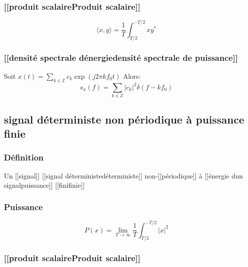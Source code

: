 \documentclass[
]{article}
\begin{document}
\hypertarget{produit-scalaireproduit-scalaire}{%
\subsubsection{{[}{[}produit scalaire\textbar Produit
scalaire{]}{]}}\label{produit-scalaireproduit-scalaire}}

\[
\langle x, y \rangle = \frac{1}{T} \int^{-T/2}_{T/2} x y^\ast
\]

\hypertarget{densituxe9-spectrale-duxe9nergiedensituxe9-spectrale-de-puissance}{%
\subsubsection{{[}{[}densité spectrale
d\textquotesingle énergie\textbar densité spectrale de
puissance{]}{]}}\label{densituxe9-spectrale-duxe9nergiedensituxe9-spectrale-de-puissance}}

Soit
\(x(t) = \displaystyle\sum_{k\in \mathbb{Z}} c_k \exp(j2\pi k f_0 t)\)
Alors: \[
s_x(f) = \sum_{k\in \mathbb{Z}} |c_k|^2 \delta(f - kf_0)
\]

\hypertarget{signal-duxe9terministe-non-puxe9riodique-uxe0-puissance-finie}{%
\subsection{signal déterministe non périodique à puissance
finie}\label{signal-duxe9terministe-non-puxe9riodique-uxe0-puissance-finie}}

\hypertarget{duxe9finition-2}{%
\subsubsection{Définition}\label{duxe9finition-2}}

Un {[}{[}signal{]}{]} {[}{[}signal
déterministe\textbar déterministe{]}{]} non-{[}{[}périodique{]}{]} à
{[}{[}énergie d\textquotesingle un signal\textbar puissance{]}{]}
{[}{[}fini\textbar finie{]}{]}

\hypertarget{puissance-1}{%
\subsubsection{Puissance}\label{puissance-1}}

\[
P(x) = \lim_{T\to \infty} \frac{1}{T} \int^{-T/2}_{T/2} |x|^2
\]

\hypertarget{produit-scalaireproduit-scalaire-1}{%
\subsubsection{{[}{[}produit scalaire\textbar Produit
scalaire{]}{]}}\label{produit-scalaireproduit-scalaire-1}}
\end{document}
